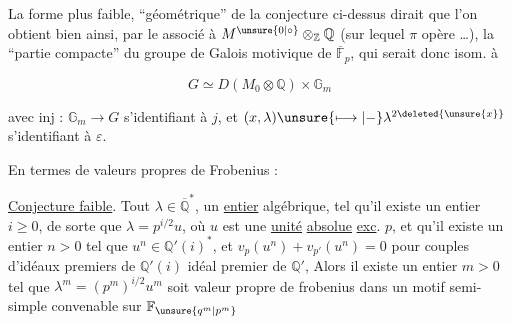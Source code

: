 
La forme plus faible, ``géométrique'' de la
conjecture ci-dessus dirait que  l'on obtient
bien ainsi, par le  associé à
$M^{\unsure{0|\circ}}\otimes_{\mathbb Z}\mathbb Q$ (sur lequel $\pi$ opère \ldots), la
 ``partie compacte'' du  groupe de Galois
motivique de $\overline{\mathbb F}_p$, qui serait donc isom. à

\[
G\simeq D(M_0\otimes\mathbb Q)\times\mathbb G_m
\]

avec  inj : $\mathbb G_m\longrightarrow G$ s'identifiant
à $j$, et  $(x,\lambda)\unsure{\longmapsto|-}\lambda^{2\deleted{\unsure{x}}}$ s'identifiant à $\varepsilon$.

En termes de valeurs propres de Frobenius :

\uline{Conjecture faible}. Tout $\lambda\in\overline{\mathbb Q}^{*}$, 
 un \uline{entier} algébrique,
tel qu'il existe un entier $i\geq0$, de sorte
que $\lambda=p^{i/2}u$,  où $u$ est une \uline{unité}
\uline{absolue} \uline{exc}. $p$, et qu'il existe un entier
$n>0$ tel que $u^n\in\mathbb Q'(i)^*$, et $v_p(u^n)+v_{p'}(u^n)=0$
pour  couples d'idéaux premiers de $\mathbb Q'(i)$ 
  idéal premier de $\mathbb Q'$, Alors il
existe un entier $m>0$ tel que
$\lambda^m=(p^m)^{i/2}u^m$ soit  valeur propre de frobenius 
dans un motif semi-simple  convenable sur $\mathbb F_{\unsure{q^m|p^m}}$

